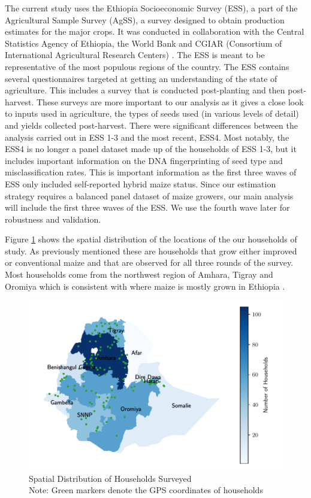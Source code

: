 \documentclass{article}
\begin{document}
The current study uses the Ethiopia Socioeconomic Survey (ESS), a part of the Agricultural Sample Survey (AgSS), a survey 
designed to obtain production estimates for the major crops. It was conducted in collaboration with the Central Statistics Agency of Ethiopia, the World Bank and CGIAR (Consortium of International Agricultural Research Centers) \citep{kosmowski2020shining}. The ESS is meant to be representative of the most populous regions of the country. The ESS contains several questionnaires targeted at getting an understanding of the state of agriculture. This includes a survey that is conducted post-planting and then post-harvest. These surveys are more important to our analysis as it gives a close look to inputs used in agriculture, the types of seeds used (in various levels of detail) and yields collected post-harvest. There were significant differences between the analysis carried out in ESS 1-3 and the most recent, ESS4. Most notably, the ESS4 is no longer a panel dataset made up of the households of ESS 1-3, but it includes important information on the DNA fingerprinting of seed type and misclassification rates. This is important information as the first three waves of ESS only included self-reported hybrid maize status. Since our estimation strategy requires a balanced panel dataset of maize growers, our main analysis will include the first three waves of the ESS. We use the fourth wave later for robustness and validation.

Figure \ref{map:regions} shows the spatial distribution of the locations of the our households of study. As previously mentioned these are households that grow either improved or conventional maize and that are observed for all three rounds of the survey. Most households come from the northwest region of Amhara, Tigray and Oromiya which is consistent with where maize is mostly grown in Ethiopia \citep{Abate2015-rj}.

\begin{figure}
    \centering
    \includegraphics{results/figures/map_hhids.pdf}
    \caption{Spatial Distribution of Households Surveyed \\ Note: Green markers denote the GPS coordinates of households}
    \label{map:regions}
\end{figure}
\end{document}
